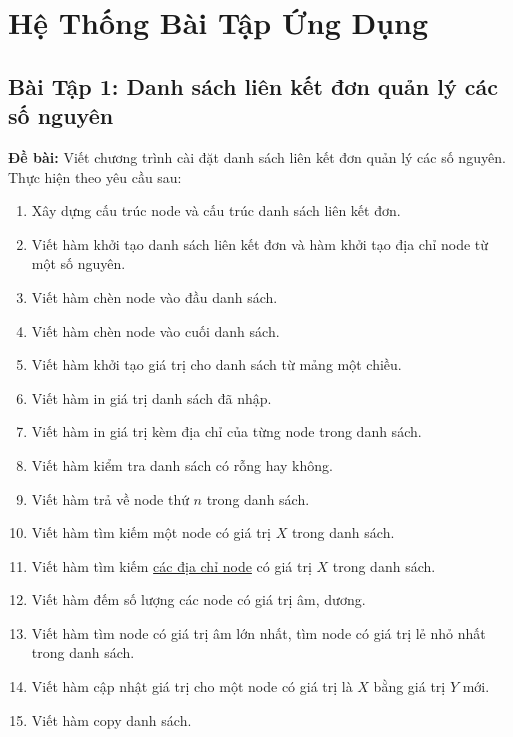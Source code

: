 \documentclass[12pt,a4paper]{article}
\begin{document}
\section{Hệ Thống Bài Tập Ứng Dụng}

\subsection{Bài Tập 1: Danh sách liên kết đơn quản lý các số nguyên}
\textbf{Đề bài:} Viết chương trình cài đặt danh sách liên kết đơn quản lý các số nguyên. Thực hiện theo yêu cầu sau:
\begin{enumerate}[itemsep=0.15em]
    \item Xây dựng cấu trúc node và cấu trúc danh sách liên kết đơn.
    \item Viết hàm khởi tạo danh sách liên kết đơn và hàm khởi tạo địa chỉ node từ một số nguyên.
    \item Viết hàm chèn node vào đầu danh sách.
    \item Viết hàm chèn node vào cuối danh sách.
    \item Viết hàm khởi tạo giá trị cho danh sách từ mảng một chiều.
    \item Viết hàm in giá trị danh sách đã nhập.
    \item Viết hàm in giá trị kèm địa chỉ của từng node trong danh sách.
    \item Viết hàm kiểm tra danh sách có rỗng hay không.
    \item Viết hàm trả về node thứ $n$ trong danh sách.
    \item Viết hàm tìm kiếm một node có giá trị $X$ trong danh sách.
    \item Viết hàm tìm kiếm \underline{các địa chỉ node} có giá trị $X$ trong danh sách.
    \item Viết hàm đếm số lượng các node có giá trị âm, dương.
    \item Viết hàm tìm node có giá trị âm lớn nhất, tìm node có giá trị lẻ nhỏ nhất trong danh sách.
    \item Viết hàm cập nhật giá trị cho một node có giá trị là $X$ bằng giá trị $Y$ mới.
    \item Viết hàm copy danh sách.
\end{enumerate}
\end{document}
